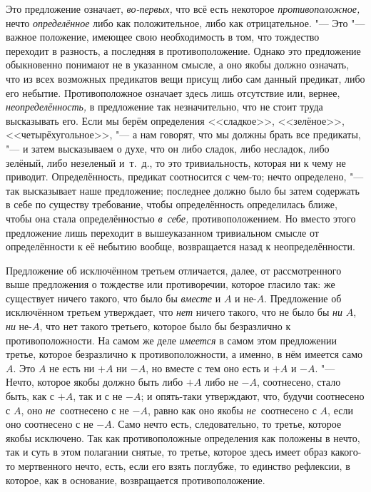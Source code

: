 Это предложение означает, {\em во-первых,} что всё есть
некоторое {\em противоположное,} нечто
{\em определённое} либо как положительное, либо как
отрицательное. "--- Это "--- важное положение, имеющее свою необходимость в
том, что тождество переходит в разность, а последняя в противоположение.
Однако это предложение обыкновенно понимают не в указанном смысле, а оно якобы
должно означать, что из всех возможных предикатов вещи присущ либо сам
данный предикат, либо его небытие. Противоположное означает здесь лишь
отсутствие или, вернее, {\em неопределённость,} в
предложение так незначительно, что не стоит труда высказывать его. Если мы
берём определения <<сладкое>>, <<зелёное>>, <<четырёхугольное>>, "--- а нам
говорят, что мы должны брать все предикаты, "--- и затем высказываем о духе,
что он либо сладок, либо несладок, либо зелёный, либо незеленый и~т.~д., то
это тривиальность, которая ни к чему не приводит. Определённость, предикат
соотносится с чем-то; нечто определено, "--- так высказывает наше предложение;
последнее должно было бы затем содержать в себе по существу требование,
чтобы определённость определилась ближе, чтобы она стала определённостью
{\em в~себе,} противоположением. Но вместо этого
предложение лишь переходит в вышеуказанном тривиальном смысле от
определённости к её небытию вообще, возвращается назад к неопределённости.

Предложение об исключённом третьем отличается, далее, от рассмотренного выше
предложения о тождестве или противоречии, которое гласило так: же
существует ничего такого, что было бы {\em вместе} и
$A$ и не-$A$. Предложение об исключённом третьем утверждает,
что {\em нет} ничего такого, что не было бы {\em ни} $A$, {\em ни} не-$A$,
что нет такого третьего, которое было бы безразлично к
противоположности. На самом же деле {\em имеется} в
самом этом предложении третье, которое безразлично к противоположности, а
именно, в нём имеется само $A$. Это $A$ не есть ни
$+A$ ни $-A$, но вместе с тем оно есть и $+A$ и
$-A$. "--- Нечто, которое якобы должно быть либо $+A$ либо
не $-A$, соотнесено, стало быть, как с $+A$, так и с
не $-A$; и опять-таки утверждают, что, будучи соотнесено с
$A$, оно {\em не}~соотнесено с не $-A$,
равно как оно якобы {\em не}~соотнесено с $A$,
если оно соотнесено с не $-A$. Само нечто есть, следовательно, то
третье, которое якобы исключено. Так как противоположные определения как
положены в нечто, так и суть в этом полагании снятые, то третье, которое
здесь имеет образ какого-то мертвенного нечто, есть, если его взять
поглубже, то единство рефлексии, в которое, как в основание, возвращается
противоположение.


